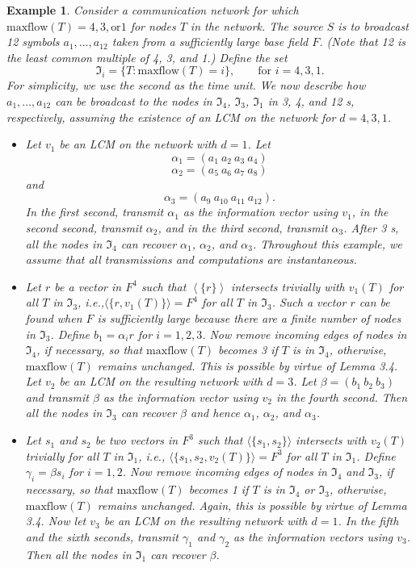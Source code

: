 \documentclass{IEEEtran}
\newtheorem{exam}{Example}
\begin{document}
\begin{exam}
	Consider a communication network for which $\text{maxflow}(T)=4,3,\text{or}1$ for nodes $T$ in the network. The source $S$ is to broadcast 12 symbols $a_1, \dots, a_{12}$ taken from a sufficiently large base field $F$. (Note that 12 is the least common 	multiple of 4, 3, and 1.) Define the set
	$$\Im_i=\{T:\text{maxflow}(T)=i\},\qquad \text{for }i=4,3,1.$$
	For simplicity, we use the second as the time unit. We now describe how $a_1, \dots, a_{12}$ can be broadcast to the nodes in $\Im_4$, $\Im_3$, $\Im_1$	in 3, 4, and 12 s, respectively, assuming the existence of an LCM on the network for $d=4,3,1$.
	\begin{itemize}
		\item[a)] Let $v_1$ be an LCM on the network with $d=1$. Let 
		$$\alpha_1=(a_1\ a_2\ a_3\ a_4)$$
		$$\alpha_2=(a_5\ a_6\ a_7\ a_8)$$
		and
		$$\alpha_3=(a_9\ a_{10}\ a_{11}\ a_{12}).$$
		In the first second, transmit $\alpha_1$ as the information vector using $v_1$, in the second second, transmit $\alpha_2$, and in the 	third second, transmit $\alpha_3$. After 3 s, all the nodes in $\Im_4$ can recover $\alpha_1$, $\alpha_2$, and $\alpha_3$. Throughout this example, we assume that all transmissions and computations are instantaneous.
		\item[b)] Let $r$ be a vector in $F^4$ such that $\left \langle \{r\}\right \rangle$ intersects trivially with $v_1(T)$ for all $T$ in $\Im_3$, i.e.,$\langle \{r,v_1(T)\} \rangle=F^4$ for all $T$ in $\Im_3$. Such a vector $r$ can be found when $F$ is sufficiently large because there are a finite number of nodes in $\Im_3$. Define $b_1=\alpha_i r$ for $i=1,2,3$. Now remove incoming edges of nodes in $\Im_4$, if necessary, so that $\text{maxflow}(T)$ becomes 3 if $T$ is in $\Im_4$, otherwise, $\text{maxflow}(T)$ remains unchanged. This is possible by virtue of Lemma 3.4. Let $v_2$ be an LCM on the resulting network with $d=3$. Let $\beta=(b_1\ b_2\ b_3)$ and transmit $\beta$ as the information vector using $v_2$ in the fourth second. Then all the nodes in $\Im_3$ can recover $\beta$ and hence $\alpha_1$, $\alpha_2$, and $\alpha_3$.
		\item[c)] Let $s_1$ and $s_2$ be two vectors in $F^3$ such that $\langle \{s_1,s_2\}\rangle$ intersects with $v_2(T)$ trivially for all $T$ in $\Im_1$, i.e., $\langle \{s_1,s_2,v_2(T)\}\rangle = F^3$ for all $T$ in $\Im_1$. Define $\gamma_i=\beta s_i$ for $i=1,2$. Now remove incoming edges of nodes in $\Im_4$ and $\Im_3$, if necessary, so that $\text{maxflow}(T)$ becomes 1 if $T$ is in $\Im_4$ or $\Im_3$, otherwise, $\text{maxflow}(T)$ remains unchanged. Again, this is possible by virtue of Lemma	3.4. Now let $v_3$ be an LCM on the resulting network with $d=1$. In the fifth and the sixth seconds, transmit $\gamma_1$ and $\gamma_2$ as the information vectors using $v_3$. Then all the	nodes in $\Im_1$ can recover $\beta$.

\end{itemize}
\end{exam}
\end{document}
